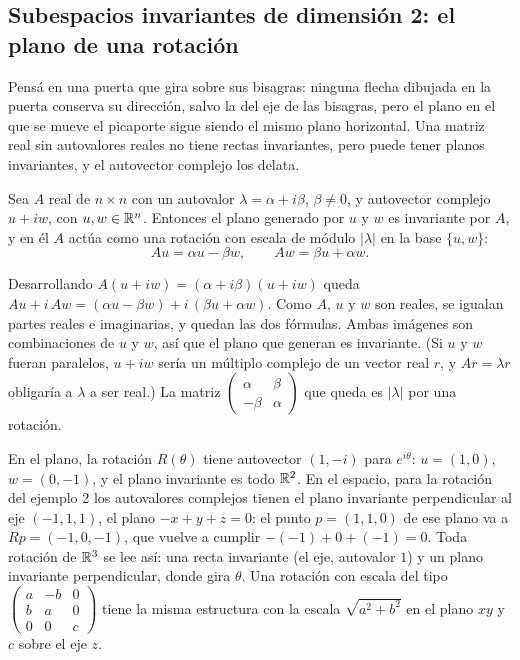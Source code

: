 \subsection{Subespacios invariantes de dimensión 2: el plano de una rotación}\label{sec:plano-invariante}

Pensá en una puerta que gira sobre sus bisagras: ninguna flecha dibujada en la puerta conserva
su dirección, salvo la del eje de las bisagras, pero el plano en el que se mueve el picaporte
sigue siendo el mismo plano horizontal. Una matriz real sin autovalores reales no tiene rectas
invariantes, pero puede tener planos invariantes, y el autovector complejo los delata.

\begin{proposicion}\label{prop:plano-invariante}
Sea \(A\) real de \(n\times n\) con un autovalor \(\lambda=\alpha+i\beta\), \(\beta\neq0\), y
autovector complejo \(u+iw\), con \(u,w\in\mathbb{R}^n\). Entonces el plano generado por \(u\) y
\(w\) es invariante por \(A\), y en él \(A\) actúa como una rotación con escala de módulo
\(|\lambda|\) en la base \(\{u,w\}\):
\[
  Au=\alpha u-\beta w,\qquad Aw=\beta u+\alpha w .
\]
\end{proposicion}

\begin{demostracion}
Desarrollando \(A(u+iw)=(\alpha+i\beta)(u+iw)\) queda
\(Au+i\,Aw=(\alpha u-\beta w)+i\,(\beta u+\alpha w)\).
Como \(A\), \(u\) y \(w\) son reales, se igualan partes reales e imaginarias, y quedan las dos
fórmulas. Ambas imágenes son combinaciones de \(u\) y \(w\), así que el plano que generan es
invariante. (Si \(u\) y \(w\) fueran paralelos, \(u+iw\) sería un múltiplo complejo de un
vector real \(r\), y \(Ar=\lambda r\) obligaría a \(\lambda\) a ser real.) La matriz
\(\left(\begin{smallmatrix}\alpha&\beta\\-\beta&\alpha\end{smallmatrix}\right)\) que queda es
\(|\lambda|\) por una rotación.
\end{demostracion}

En el plano, la rotación \(R(\theta)\) tiene autovector \((1,-i)\) para \(e^{i\theta}\): \(u=(1,0)\),
\(w=(0,-1)\), y el plano invariante es todo \(\mathbb{R}^2\). En el espacio, para la rotación del
ejemplo 2 los autovalores complejos tienen el plano invariante perpendicular al eje
\((-1,1,1)\), el plano \(-x+y+z=0\): el punto \(p=(1,1,0)\) de ese plano va a
\(Rp=(-1,0,-1)\), que vuelve a cumplir \(-(-1)+0+(-1)=0\). Toda rotación de \(\mathbb{R}^3\) se lee
así: una recta invariante (el eje, autovalor \(1\)) y un plano invariante perpendicular, donde
gira \(\theta\). Una rotación con escala del tipo
\(\left(\begin{smallmatrix}a&-b&0\\b&a&0\\0&0&c\end{smallmatrix}\right)\) tiene la misma
estructura con la escala \(\sqrt{a^2+b^2}\) en el plano \(xy\) y \(c\) sobre el eje \(z\).

